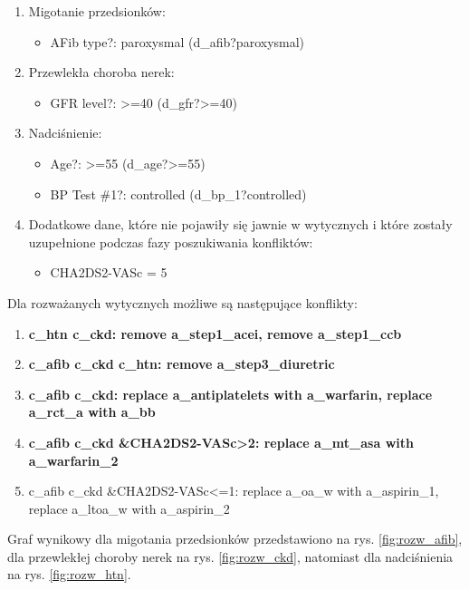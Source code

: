 \begin{enumerate}
\item{Migotanie przedsionków:
	\begin{itemize}
	\item{AFib type?: paroxysmal (d\_afib?paroxysmal)}
	\end{itemize}
}
\item{Przewlekła choroba nerek:
	\begin{itemize}
	\item{GFR level?: >=40 (d\_gfr?>=40)}
	\end{itemize}
}
\newpage
\item{Nadciśnienie:
	\begin{itemize}
	\item{Age?: >=55 (d\_age?>=55)}
	\item{BP Test \#1?: controlled (d\_bp\_1?controlled)}
	\end{itemize}
}
\item Dodatkowe dane, które nie pojawiły się jawnie w wytycznych i które zostały uzupełnione podczas fazy poszukiwania konfliktów:
	\begin{itemize}
	\item{CHA2DS2-VASc = 5}
	\end{itemize}
\end{enumerate}
Dla rozważanych wytycznych możliwe są następujące konflikty:
\begin{enumerate}
\item \textbf{c\_htn c\_ckd: remove a\_step1\_acei, remove a\_step1\_ccb}
\item \textbf{c\_afib c\_ckd c\_htn: remove a\_step3\_diuretric}
\item \textbf{c\_afib c\_ckd: replace a\_antiplatelets with a\_warfarin, replace a\_rct\_a with a\_bb}
\item \textbf{c\_afib c\_ckd \&CHA2DS2-VASc>2: replace a\_mt\_asa with a\_warfarin\_2}
\item c\_afib c\_ckd \&CHA2DS2-VASc<=1: replace a\_oa\_w with a\_aspirin\_1, replace a\_ltoa\_w with a\_aspirin\_2
\end{enumerate}

Graf wynikowy dla migotania przedsionków przedstawiono na rys. \ref{fig:rozw_afib}, dla przewlekłej choroby nerek na rys. \ref{fig:rozw_ckd}, natomiast dla nadciśnienia na rys. \ref{fig:rozw_htn}.

